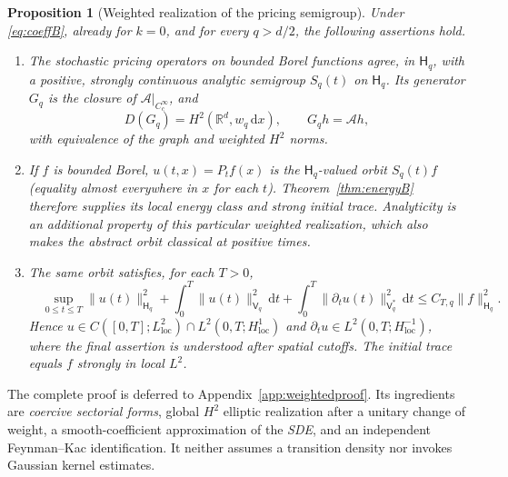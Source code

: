 \documentclass[11pt,a4paper]{article}
\newtheorem{proposition}[theorem]{Proposition}
\theoremstyle{definition}\newtheorem{definition}{Definition}[section]\newtheorem{example}[theorem]{Example}
\theoremstyle{remark}\newtheorem{remark}[theorem]{Remark}\newtheorem{remarkSix}{Remark}[section]
\newcommand{\Rd}{\mathbb R^d}
\newcommand{\Cc}{C_c^\infty}
\newcommand{\loc}{\mathrm{loc}}
\newcommand{\dd}{\,\mathrm d}
\newcommand{\norm}[1]{\lVert #1\rVert}
\newcommand{\cA}{\mathcal A}
\newcommand{\HH}{\mathsf H_q}
\newcommand{\VV}{\mathsf V_q}
\begin{document}
\begin{proposition}[Weighted realization of the pricing semigroup]\label{prop:weighted}
Under \eqref{eq:coeffB}, already for $k=0$, and for every $q>d/2$, the following assertions hold.
\begin{enumerate}[label=\textup{(\roman*)},leftmargin=9mm,itemsep=3pt]
\item The stochastic pricing operators on bounded Borel functions agree, in $\HH$, with a positive, strongly continuous \emph{analytic} semigroup $S_q(t)$ on $\HH$. Its generator $G_q$ is the closure of $\cA|_{\Cc}$, and
\begin{equation}\label{eq:weightedgenB}
 D(G_q)=H^2(\Rd,w_q\dd x),\qquad G_qh=\cA h,
\end{equation}
with equivalence of the graph and weighted $H^2$ norms.
\item If $f$ is bounded Borel, $u(t,x)=P_tf(x)$ is the $\HH$-valued orbit $S_q(t)f$ (equality almost everywhere in $x$ for each $t$). Theorem~\ref{thm:energyB} therefore supplies its local energy class and strong initial trace. Analyticity is an \emph{additional} property of this particular weighted realization, which also makes the abstract orbit classical at positive times.
\item The same orbit satisfies, for each $T>0$,
\begin{equation}\label{eq:weightenergyB}
\boxed{\quad \sup_{0\le t\le T}\norm{u(t)}_{\HH}^2
 +\int_0^T\norm{u(t)}_{\VV}^2\dd t
 +\int_0^T\norm{\partial_tu(t)}_{\VV^*}^2\dd t
 \le C_{T,q}\norm f_{\HH}^2.\quad}
\end{equation}
Hence $u\in C([0,T];L^2_{\loc})\cap L^2(0,T;H^1_{\loc})$ and $\partial_tu\in L^2(0,T;H^{-1}_{\loc})$, where the final assertion is understood after spatial cutoffs. The initial trace equals $f$ strongly in local $L^2$.
\end{enumerate}
\end{proposition}
\noindent The complete proof is deferred to Appendix~\ref{app:weightedproof}. Its ingredients are \emph{coercive sectorial forms}, global $H^2$ elliptic realization after a unitary change of weight, a smooth-coefficient approximation of the \emph{SDE}, and an independent Feynman--Kac identification. It neither assumes a transition density nor invokes Gaussian kernel estimates.
\end{document}
